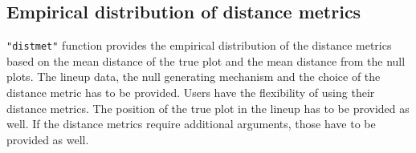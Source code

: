 \documentclass[article]{jss}
\begin{document}
\subsection{Empirical distribution of distance
metrics}\label{distribution-of-distance-metrics}

 \texttt{"distmet"} function provides
the empirical distribution of the distance metrics based on the mean
distance of the true plot and the mean distance from the null plots. The
lineup data, the null generating mechanism and the choice of the
distance metric has to be provided. Users have the flexibility of using
their distance metrics. The position of the true plot in the lineup has
to be provided as well. If the distance metrics require additional
arguments, those have to be provided as well.

%
%
\end{document}
